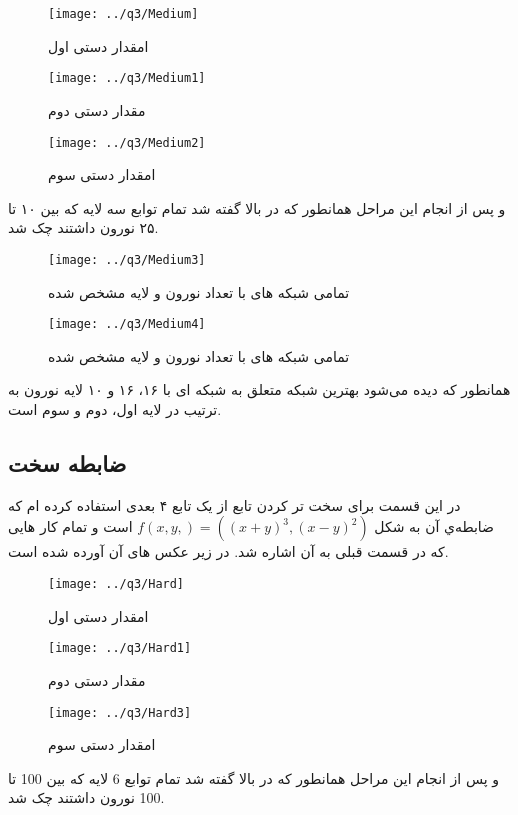 \documentclass[a4paper,12pt]{article}
\begin{document}
\begin{figure}[!htb]
  \texttt{[image: ../q3/Medium]}
  \caption{ امقدار دستی اول}
\endminipage\hfill
{}
  \texttt{[image: ../q3/Medium1]}
  \caption{مقدار دستی دوم}
\endminipage\hfill
\end{figure}

\begin{figure}[!htb]
  \texttt{[image: ../q3/Medium2]}
  \caption{ امقدار دستی سوم}
\endminipage\hfill
\end{figure}
\newpage
و پس از انجام این مراحل همانطور که در بالا گفته شد تمام توابع سه لایه که بین ۱۰ تا ۲۵ نورون داشتند چک شد.

\begin{figure}[!htb]
  \texttt{[image: ../q3/Medium3]}
  \caption{ تمامی شبکه ‌های با تعداد نورون و لایه مشخص شده }
\endminipage\hfill
{}
  \texttt{[image: ../q3/Medium4]}
  \caption{تمامی شبکه ‌های با تعداد نورون و لایه مشخص شده}
\endminipage\hfill
\end{figure}
همانطور که دیده می‌شود بهترین شبکه متعلق به شبکه ای با ۱۶، ۱۶ و ۱۰ لایه نورون به ترتیب در لایه اول، دوم و سوم است.

\newpage
\subsection{ضابطه سخت}
در این قسمت برای سخت تر کردن تابع از یک تابع ۴ بعدی استفاده کرده ام که ضابطه‌ي آن به شکل $        f(x,y,) =( (x+y)^3, (x-y)^2)  $ است و  تمام کار هایی که در قسمت قبلی به آن اشاره شد. در زیر عکس های‌ آن آورده شده است.

\begin{figure}[!htb]
  \texttt{[image: ../q3/Hard]}
  \caption{ امقدار دستی اول}
\endminipage\hfill
{}
  \texttt{[image: ../q3/Hard1]}
  \caption{مقدار دستی دوم}
\endminipage\hfill
\end{figure}

\begin{figure}[!htb]
  \texttt{[image: ../q3/Hard3]}
  \caption{ امقدار دستی سوم}
\endminipage\hfill
\end{figure}
\newpage
و پس از انجام این مراحل همانطور که در بالا گفته شد تمام توابع 6 لایه که بین 100 تا 100 نورون داشتند چک شد.
\end{document}
